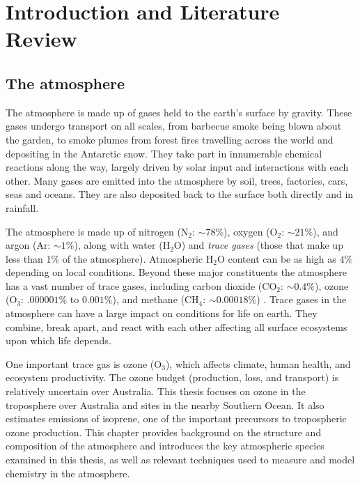 \chapter{Introduction and Literature Review} %
\label{LR}

\section{The atmosphere}
\label{LR:Atmos}
  The atmosphere is made up of gases held to the earth's surface by gravity. 
  These gases undergo transport on all scales, from barbecue smoke being blown about the garden, to smoke plumes from forest fires travelling across the world and depositing in the Antarctic snow.
  They take part in innumerable chemical reactions along the way, largely driven by solar input and interactions with each other.
  Many gases are emitted into the atmosphere by soil, trees, factories, cars, seas and oceans.
  They are also deposited back to the surface both directly and in rainfall.
  
  The atmosphere is made up of nitrogen (N$_2$: $\sim 78\%$), oxygen (O$_2$: 
  $\sim 21\%$), and argon (Ar: $\sim 1\%$), along with water (H$_2$O) and 
  \textit{trace gases} (those that make up less than 1\% of the atmosphere).
  Atmospheric H$_2$O content can be as high as $4\%$ depending on local 
  conditions.
  Beyond these major constituents the atmosphere has a vast number of trace 
  gases, including carbon dioxide (CO$_2$: $\sim 0.4\%$), ozone (O$_3$: 
  $.000001\%$ to $0.001\%$), and methane (CH$_4$: $\sim 0.00018\%$) 
  \parencite[][Ch. 2]{NOAAch4, BrasseurJacob2017}.
  Trace gases in the atmosphere can have a large impact on conditions for life on earth.
  They combine, break apart, and react with each other affecting all surface ecosystems upon which life depends.
  
  One important trace gas is ozone (O$_3$), which affects climate, human health, and ecosystem productivity.
  The ozone budget (production, loss, and transport) is relatively uncertain 
  over Australia.
  This thesis focuses on ozone in the troposphere over Australia and sites in 
  the nearby Southern Ocean.
  It also estimates emissions of isoprene, one of the important precursors to tropospheric ozone production.
  This chapter provides background on the structure and composition of the 
  atmosphere and introduces the key atmospheric species examined in this 
  thesis, as well as relevant techniques used to measure and model chemistry in 
  the atmosphere.
  
